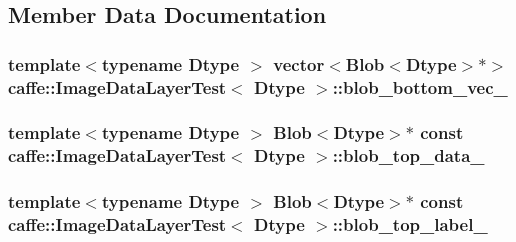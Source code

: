 \subsection{Member Data Documentation}
\hypertarget{classcaffe_1_1_image_data_layer_test_a79a6acfec89c11df35f53489d7ea5912}{
\subsubsection[{blob\+\_\+bottom\+\_\+vec\+\_\+}]{\setlength{\rightskip}{0pt plus 5cm}template$<$typename Dtype $>$ vector$<${\bf Blob}$<$Dtype$>$$\ast$$>$ {\bf caffe\+::\+Image\+Data\+Layer\+Test}$<$ Dtype $>$\+::blob\+\_\+bottom\+\_\+vec\+\_\+\hspace{0.3cm}{\ttfamily [protected]}}}\label{classcaffe_1_1_image_data_layer_test_a79a6acfec89c11df35f53489d7ea5912}
\hypertarget{classcaffe_1_1_image_data_layer_test_a6e19bc2019229f48d4c4144be5c45862}{
\subsubsection[{blob\+\_\+top\+\_\+data\+\_\+}]{\setlength{\rightskip}{0pt plus 5cm}template$<$typename Dtype $>$ {\bf Blob}$<$Dtype$>$$\ast$ const {\bf caffe\+::\+Image\+Data\+Layer\+Test}$<$ Dtype $>$\+::blob\+\_\+top\+\_\+data\+\_\+\hspace{0.3cm}{\ttfamily [protected]}}}\label{classcaffe_1_1_image_data_layer_test_a6e19bc2019229f48d4c4144be5c45862}
\hypertarget{classcaffe_1_1_image_data_layer_test_aa134584d35b9b3a7a8a6d3a124be3bc9}{
\subsubsection[{blob\+\_\+top\+\_\+label\+\_\+}]{\setlength{\rightskip}{0pt plus 5cm}template$<$typename Dtype $>$ {\bf Blob}$<$Dtype$>$$\ast$ const {\bf caffe\+::\+Image\+Data\+Layer\+Test}$<$ Dtype $>$\+::blob\+\_\+top\+\_\+label\+\_\+\hspace{0.3cm}{\ttfamily [protected]}}}\label{classcaffe_1_1_image_data_layer_test_aa134584d35b9b3a7a8a6d3a124be3bc9}
